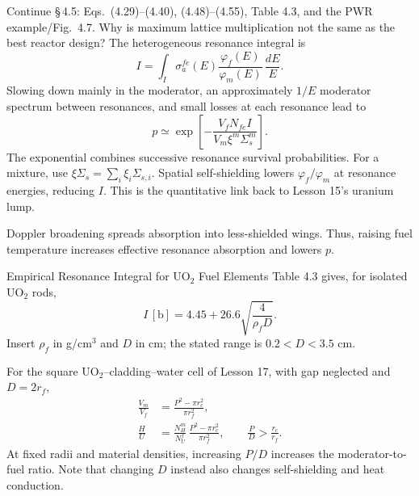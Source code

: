 \documentclass{ne630handout}
\begin{document}
\fontsize{9.5}{11.5}\selectfont
\RaggedRight

 {Continue \S\,4.5: Eqs.\ (4.29)--(4.40), (4.48)--(4.55), Table 4.3, and the PWR example/Fig.\ 4.7.}
 {Why is maximum lattice multiplication not the same as the best reactor design?}
\colstart
{}
The heterogeneous resonance integral is
\[
 I=\int_I\sigma_a^{fe}(E)
 \frac{\varphi_f(E)}{\varphi_m(E)}\,\frac{dE}{E}.
\]
Slowing down mainly in the moderator, an approximately $1/E$ moderator spectrum between resonances, and small losses at each resonance lead to
\[
 \boxed{p\simeq\exp\!\left[-\frac{V_fN_{fe} I}{V_m\xi^m\Sigma_s^m}\right].}
\]
The exponential combines successive resonance survival probabilities. For a mixture, use $\xi\Sigma_s=\sum_i\xi_i\Sigma_{s,i}$.
Spatial self-shielding lowers $\varphi_f/\varphi_m$ at resonance energies, reducing $I$. This is the quantitative link back to Lesson 15's uranium lump.
\begin{center}\resizebox{\linewidth}{!}{\ResonanceFigure}\end{center}
\vspace{-6pt}
Doppler broadening spreads absorption into less-shielded wings.  Thus, raising fuel temperature increases effective resonance absorption and lowers $p$.

\begin{KeyBox}{Empirical Resonance Integral for UO$_2$ Fuel Elements}
Table 4.3 gives, for isolated UO$_2$ rods,
\[
 I\,[\mathrm b]=4.45+26.6\sqrt{\frac4{\rho_fD}}.
\]
Insert $\rho_f$ in g/cm$^3$ and $D$ in cm; the stated range is $0.2<D<3.5$ cm.
\end{KeyBox}
\colnext
{}
For the square UO$_2$--cladding--water cell of Lesson 17, with gap neglected and $D=2r_f$,
\begin{align*}
 \frac{V_m}{V_f}&=\frac{P^2-\pi r_c^2}{\pi r_f^2},\\
 \frac HU&=\frac{N_H^m}{N_U^f}\,
 \frac{P^2-\pi r_c^2}{\pi r_f^2},\qquad \frac PD>\frac{r_c}{r_f}.
\end{align*}
At fixed radii and material densities, increasing $P/D$ increases the moderator-to-fuel ratio. Note that changing $D$ instead also changes self-shielding and heat conduction.
\end{document}
